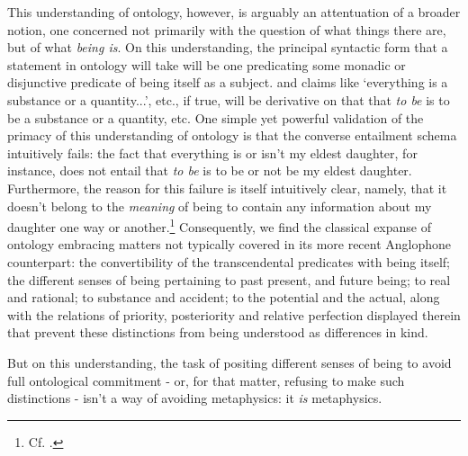 \documentclass[]{article}
\begin{document}
This understanding of ontology, 
however, 
is arguably 
an attentuation of a broader notion, 
one concerned not primarily with the question of what things there are, but of what \emph{being is}. 
On this understanding, 
the principal syntactic form that a statement in ontology will take will be one predicating some monadic or disjunctive predicate of being itself as a subject. 
and claims like `everything is a substance or a quantity...', etc., 
if true, 
will be derivative on that that \emph{to be} is to be a substance or a quantity, etc. 
One simple yet powerful validation of the primacy of this understanding of ontology is that the converse entailment schema intuitively fails: 
the fact that everything is or isn't my eldest daughter, for instance, 
does not entail that \emph{to be} is to be or not be my eldest daughter. 
Furthermore, the reason for this failure is itself intuitively clear, 
namely, 
that it doesn't belong to the \emph{meaning} of being to contain any information about my daughter one way or another.\footnote{Cf. \autocite{Fine1994}.}
Consequently, we find the classical expanse of ontology embracing matters not typically covered in its more recent Anglophone counterpart: 
the convertibility of the transcendental predicates with being itself;  
the different senses of being pertaining 
to past present, and future being; 
to real and rational; 
to substance and accident; 
to the potential and the actual, 
along with the relations of priority, posteriority and relative perfection displayed therein
that prevent these distinctions from being understood as differences in kind. 

But on this understanding, the task of positing different senses of being to avoid full ontological commitment - 
or, for that matter, refusing to make such distinctions - 
isn't a way of avoiding metaphysics: it \emph{is} metaphysics.
\end{document}
